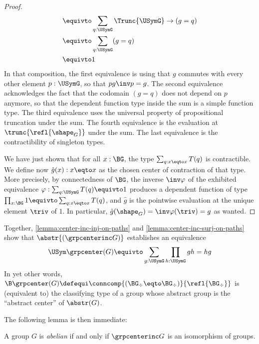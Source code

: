 \begin{proof}
\begin{displaymath}
\begin{aligned}
      &\equivto \sum_{q:\USymG}\Trunc{\USymG}\to (g=q)
      \\
      &\equivto \sum_{q:\USymG} (g=q)
      \\
      &\equivto 1
    \end{aligned}
  \end{displaymath}%
  In that composition, the first equivalence is using that $g$ commutes with
  every other element $p:\USymG$, so that $pg \inv p = g$. The second
  equivalence acknowledges the fact that the codomain $(g=q)$ does not depend on
  $p$ anymore, so that the dependent function type inside the sum is a simple
  function type. The third equivalence uses the universal property of
  propositional truncation under the sum. The fourth equivalence is the
  evaluation at $\trunc{\refl {\shape_G}}$ under the sum. The last equivalence
  is the contractibility of singleton types.%

  We have just shown that for all $x:\BG$, the type $\sum_{q:x\eqto x}T(q)$ is
  contractible. We define now $\hat g(x):x\eqto x$ as the chosen center of
  contraction of that type. More precisely, by connectedness of $\BG$, the
  inverse $\inv\varphi$ of the exhibited equivalence
  $\varphi:\sum_{q:\USymG}T(q) \equivto 1$ produces a dependent function of
  type $\prod_{x:\BG}1\equivto \sum_{q: x\eqto x}T(q)$, and $\hat g$ is the
  pointwise evaluation at the unique element $\triv$ of $1$. In particular,
  $\hat g (\shape_G) = \inv\varphi (\triv) = g$ as wanted.
\end{proof}

Together, \cref{lemma:center-inc-inj-on-paths} and
\cref{lemma:center-inc-surj-on-paths} show that
$\abstr{(\grpcenterinc G)}$ establishes an equivalence
\begin{equation}
  \USym \grpcenter(G) \equivto \sum_{g:\USymG}\prod_{h:\USymG}gh=hg
\end{equation}
In yet other words,
$\B \grpcenter(G)\defequi \conncomp{(\BG_\div \eqto \BG_\div)}
{\refl{\BG_\div}}$ is (equivalent to) the classifying type of a
group whose abstract group is the ``abstract center'' of $\abstr(G)$.

The following lemma is then immediate:
\begin{lemma}
  \label{def:abelian-groups}%
  A group $G$ is {\em abelian} if and only if $\grpcenterinc G$ is an
  isomorphism of groups.
\end{lemma}

